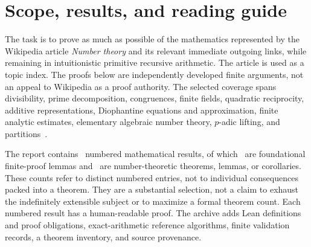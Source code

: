 \section*{Scope, results, and reading guide}

The task is to prove as much as possible of the mathematics represented by the Wikipedia article \emph{Number theory} and its relevant immediate outgoing links, while remaining in intuitionistic primitive recursive arithmetic. The article is used as a topic index. The proofs below are independently developed finite arguments, not an appeal to Wikipedia as a proof authority. The selected coverage spans divisibility, prime decomposition, congruences, finite fields, quadratic reciprocity, additive representations, Diophantine equations and approximation, finite analytic estimates, elementary algebraic number theory, $p$-adic lifting, and partitions~\cite{wiki-number,mit781}.

The report contains \ResultCount\ numbered mathematical results, of which \FoundationCount\ are foundational finite-proof lemmas and \NumberTheoryCount\ are number-theoretic theorems, lemmas, or corollaries. These counts refer to distinct numbered entries, not to individual consequences packed into a theorem. They are a substantial selection, not a claim to exhaust the indefinitely extensible subject or to maximize a formal theorem count. Each numbered result has a human-readable proof. The archive adds Lean definitions and proof obligations, exact-arithmetic reference algorithms, finite validation records, a theorem inventory, and source provenance.

